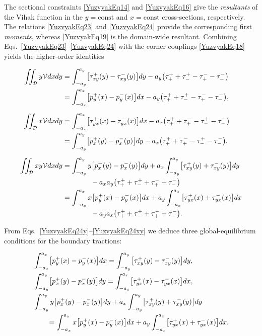 The sectional constraints \eqref{YuzvyakEq14} and \eqref{YuzvyakEq16}
give the \emph{resultants} of the Vihak function in the
$y = \text{const}$ and $x = \text{const}$ cross-sections,
respectively.  
The relations \eqref{YuzvyakEq23} and \eqref{YuzvyakEq24} provide the
corresponding first \emph{moments}, whereas
\eqref{YuzvyakEq19} is the domain-wide resultant.
Combining Eqs.~\eqref{YuzvyakEq23}–\eqref{YuzvyakEq24} with the corner
couplings \eqref{YuzvyakEq18} yields the higher-order identities

\begin{align}
	\iint_{\mathcal D} y \mathcal V dx dy
	&=\int_{-a_y}^{a_y} \bigl[\tau_{xy}^{+}(y)-\tau_{xy}^{-}(y)\bigr] dy
	-a_y\bigl(\tau_{+}^{+}+\tau_{-}^{+}-\tau_{+}^{-}-\tau_{-}^{-}\bigr)
	\notag\\
	&=\int_{-a_x}^{a_x} \bigl[p_{y}^{+}(x)-p_{y}^{-}(x)\bigr] dx
	-a_y\bigl(\tau_{+}^{+}+\tau_{-}^{+}-\tau_{+}^{-}-\tau_{-}^{-}\bigr),
	\label{YuzvyakEq24y}
	\\[6pt]
	\iint_{\mathcal D} x \mathcal V dx dy
	&=\int_{-a_x}^{a_x} \bigl[\tau_{yx}^{+}(x)-\tau_{yx}^{-}(x)\bigr] dx
	-a_x\bigl(\tau_{+}^{+}+\tau_{+}^{-}-\tau_{-}^{+}-\tau_{-}^{-}\bigr)
	\notag\\
	&=\int_{-a_y}^{a_y} \bigl[p_{x}^{+}(y)-p_{x}^{-}(y)\bigr] dy
	-a_x\bigl(\tau_{+}^{+}+\tau_{+}^{-}-\tau_{-}^{+}-\tau_{-}^{-}\bigr),
	\label{YuzvyakEq24x}
	\\[6pt]
	\iint_{\mathcal D} x y \mathcal V dx dy
	&=\int_{-a_y}^{a_y} y\bigl[p_{x}^{+}(y)-p_{x}^{-}(y)\bigr] dy
	+a_x \int_{-a_y}^{a_y} \bigl[\tau_{xy}^{+}(y)+\tau_{xy}^{-}(y)\bigr] dy
	\notag\\
	&\qquad\qquad-a_xa_y\bigl(\tau_{+}^{+}+\tau_{-}^{+}+\tau_{+}^{-}+\tau_{-}^{-}\bigr)\notag\\
	&=\int_{-a_x}^{a_x} x\bigl[p_{y}^{+}(x)-p_{y}^{-}(x)\bigr] dx
	+a_y \int_{-a_x}^{a_x} \bigl[\tau_{yx}^{+}(x)+\tau_{yx}^{-}(x)\bigr] dx\notag\\
	&\qquad\qquad-a_ya_x\bigl(\tau_{+}^{+}+\tau_{-}^{+}+\tau_{+}^{-}+\tau_{-}^{-}\bigr).
	\label{YuzvyakEq24xy}
\end{align}

From Eqs.~\eqref{YuzvyakEq24y}–\eqref{YuzvyakEq24xy} we deduce three
global-equilibrium conditions for the boundary tractions:

\begin{align}
	&\int_{-a_x}^{a_x} \bigl[p_{y}^{+}(x)-p_{y}^{-}(x)\bigr] dx
	=\int_{-a_y}^{a_y} \bigl[\tau_{xy}^{+}(y)-\tau_{xy}^{-}(y)\bigr] dy,
	\label{YuzvyakEq25}
	\\
	&\int_{-a_y}^{a_y} \bigl[p_{x}^{+}(y)-p_{x}^{-}(y)\bigr] dy
	=\int_{-a_x}^{a_x} \bigl[\tau_{yx}^{+}(x)-\tau_{yx}^{-}(x)\bigr] dx,
	\label{YuzvyakEq26}
	\\
	&\int_{-a_y}^{a_y} y\bigl[p_{x}^{+}(y)-p_{x}^{-}(y)\bigr] dy
	+a_x \int_{-a_y}^{a_y} \bigl[\tau_{xy}^{+}(y)+\tau_{xy}^{-}(y)\bigr] dy \notag
	\\
	&\qquad=\int_{-a_x}^{a_x} x\bigl[p_{y}^{+}(x)-p_{y}^{-}(x)\bigr] dx
	+a_y \int_{-a_x}^{a_x} \bigl[\tau_{yx}^{+}(x)+\tau_{yx}^{-}(x)\bigr] dx.
	\label{YuzvyakEq27}
\end{align}


